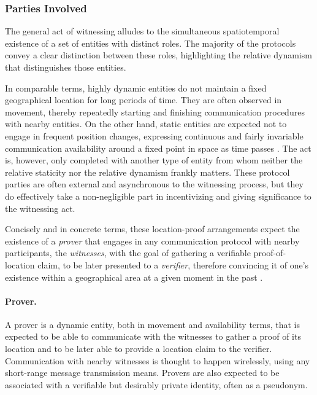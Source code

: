 
\subsubsection{Parties Involved}

The general act of witnessing alludes to the simultaneous spatiotemporal existence of a set of entities with distinct roles. The majority of the protocols convey a clear distinction between these roles, highlighting the relative dynamism that distinguishes those entities. 

In comparable terms, highly dynamic entities do not maintain a fixed geographical location for long periods of time. They are often observed in movement, thereby repeatedly starting and finishing communication procedures with nearby entities. On the other hand, static entities are expected not to engage in frequent position changes, expressing continuous and fairly invariable communication availability around a fixed point in space as time passes \cite{nasrulin2018robust}. The act is, however, only completed with another type of entity from whom neither the relative staticity nor the relative dynamism frankly matters. These protocol parties are often external and asynchronous to the witnessing process, but they do effectively take a non-negligible part in incentivizing and giving significance to the witnessing act. 

Concisely and in concrete terms, these location-proof arrangements expect the existence of a \emph{prover} that engages in any communication protocol with nearby participants, the \emph{witnesses}, with the goal of gathering a verifiable proof-of-location claim, to be later presented to a \emph{verifier}, therefore convincing it of one's existence within a geographical area at a given moment in the past \cite{dupin2018location}.

\paragraph{Prover.} A prover is a dynamic entity, both in movement and availability terms, that is expected to be able to communicate with the witnesses to gather a proof of its location and to be later able to provide a location claim to the verifier. Communication with nearby witnesses is thought to happen wirelessly, using any short-range message transmission means. Provers are also expected to be associated with a verifiable but desirably private identity, often as a pseudonym.

